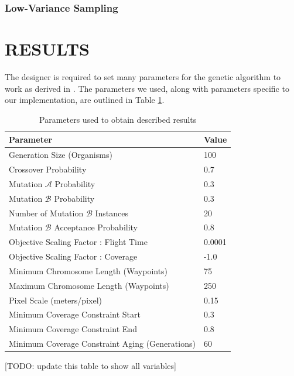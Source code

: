 \documentclass[letterpaper, 10 pt, conference]{ieeeconf}  %
\newcommand{\todo}[1]{{\color{blue}[TODO: #1]}}
\begin{document}
\subsubsection{Low-Variance Sampling}


\section{RESULTS}\label{results}

The designer is required to set many parameters for the genetic algorithm to work as derived in \cite{Parkinson2019}. The parameters we used, along with parameters specific to our implementation, are outlined in Table \ref{tab:parameters}.

\begin{table}
  \caption{Parameters used to obtain described results}
\begin{tabular}{l|l}
\hline
\multicolumn{1}{|l|}{Parameter}                 & \multicolumn{1}{l|}{Value} \\ \hline
Generation Size (Organisms)                     & 100                        \\
Crossover Probability                           & 0.7                        \\
Mutation $\mathcal{A}$ Probability              & 0.3                        \\
Mutation $\mathcal{B}$ Probability              & 0.3                        \\
Number of Mutation $\mathcal{B}$ Instances      & 20                         \\
Mutation $\mathcal{B}$ Acceptance Probability   & 0.8                        \\
Objective Scaling Factor : Flight Time          & 0.0001                     \\
Objective Scaling Factor : Coverage             & -1.0                       \\
Minimum Chromosome Length (Waypoints)           & 75                         \\
Maximum Chromosome Length (Waypoints)           & 250                        \\
Pixel Scale (meters/pixel)                      & 0.15                       \\
Minimum Coverage Constraint Start               & 0.3                        \\
Minimum Coverage Constraint End                 & 0.8                        \\
Minimum Coverage Constraint Aging (Generations) & 60                         \\
\end{tabular}
\label{tab:parameters}
\todo{update this table to show all variables}
\end{table}
\end{document}
